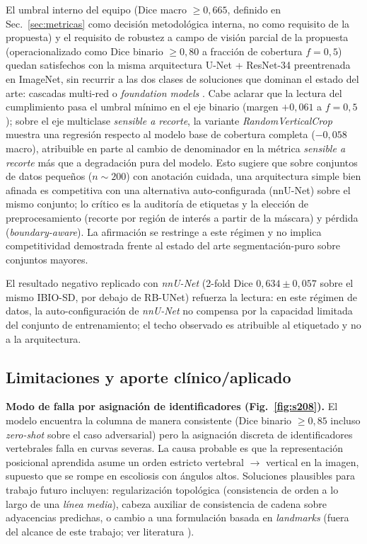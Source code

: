 \documentclass[conference]{IEEEtran}
\begin{document}
El umbral interno del equipo (Dice macro $\geq 0{,}665$, definido en Sec.~\ref{sec:metricas} como decisión metodológica interna, no como requisito de la propuesta) y el requisito de robustez a campo de visión parcial de la propuesta (operacionalizado como Dice binario $\geq 0{,}80$ a fracción de cobertura $f = 0{,}5$) quedan satisfechos con la misma arquitectura U-Net + ResNet-34 preentrenada en ImageNet, sin recurrir a las dos clases de soluciones que dominan el estado del arte: cascadas multi-red \cite{seg4reg, snomed_pipe, vertxnet} o \emph{foundation models} \cite{spinefm}. Cabe aclarar que la lectura del cumplimiento pasa el umbral mínimo en el eje binario (margen $+0{,}061$ a $f=0{,}5$); sobre el eje multiclase \emph{sensible a recorte}, la variante \emph{RandomVerticalCrop} muestra una regresión respecto al modelo base de cobertura completa ($-0{,}058$ macro), atribuible en parte al cambio de denominador en la métrica \emph{sensible a recorte} más que a degradación pura del modelo. Esto sugiere que sobre conjuntos de datos pequeños ($n \sim 200$) con anotación cuidada, una arquitectura simple bien afinada es competitiva con una alternativa auto-configurada (nnU-Net) sobre el mismo conjunto; lo crítico es la auditoría de etiquetas y la elección de preprocesamiento (recorte por región de interés a partir de la máscara) y pérdida (\emph{boundary-aware}). La afirmación se restringe a este régimen y no implica competitividad demostrada frente al estado del arte segmentación-puro sobre conjuntos mayores.

El resultado negativo replicado con \emph{nnU-Net} \cite{nnunet} (2-fold Dice $0{,}634 \pm 0{,}057$ sobre el mismo IBIO-SD, por debajo de RB-UNet) refuerza la lectura: en este régimen de datos, la auto-configuración de \emph{nnU-Net} no compensa por la capacidad limitada del conjunto de entrenamiento; el techo observado es atribuible al etiquetado y no a la arquitectura.

\subsection{Limitaciones y aporte clínico/aplicado}

\textbf{Modo de falla por asignación de identificadores (Fig.~\ref{fig:s208}).} El modelo encuentra la columna de manera consistente (Dice binario $\geq 0{,}85$ incluso \emph{zero-shot} sobre el caso adversarial) pero la asignación discreta de identificadores vertebrales falla en curvas severas. La causa probable es que la representación posicional aprendida asume un orden estricto vertebral $\rightarrow$ vertical en la imagen, supuesto que se rompe en escoliosis con ángulos altos. Soluciones plausibles para trabajo futuro incluyen: regularización topológica (consistencia de orden a lo largo de una \emph{línea media}), cabeza auxiliar de consistencia de cadena sobre adyacencias predichas, o cambio a una formulación basada en \emph{landmarks} (fuera del alcance de este trabajo; ver literatura \cite{boostnet, vfld, lanet, spinenet}).
\end{document}
